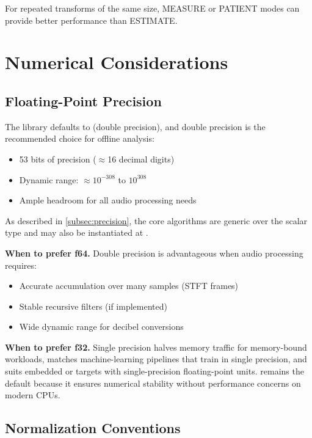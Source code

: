 For repeated transforms of the same size, MEASURE or PATIENT modes
can provide better performance than ESTIMATE.

\section{Numerical Considerations}\label{sec:numerical}

\subsection{Floating-Point Precision}\label{subsec:precision-f64}

The library defaults to  (double precision), and double
precision is the recommended choice for offline analysis:

\begin{itemize}
  \item 53 bits of precision ($\approx$16 decimal digits)
  \item Dynamic range: $\approx 10^{-308}$ to $10^{308}$
  \item Ample headroom for all audio processing needs
\end{itemize}

As described in \cref{subsec:precision}, the core algorithms are
generic over the scalar type and may also be instantiated at .

\textbf{When to prefer f64.} Double precision is advantageous when
audio processing requires:
\begin{itemize}
  \item Accurate accumulation over many samples (STFT frames)
  \item Stable recursive filters (if implemented)
  \item Wide dynamic range for decibel conversions
\end{itemize}

\textbf{When to prefer f32.} Single precision halves memory traffic for
memory-bound workloads, matches machine-learning pipelines that train
in single precision, and suits embedded or  targets with
single-precision floating-point units.  remains the default
because it ensures numerical stability without performance concerns on
modern CPUs.

\subsection{Normalization Conventions}\label{subsec:normalization}


